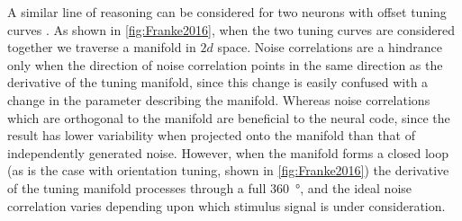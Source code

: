 A similar line of reasoning can be considered for two neurons with offset tuning curves \citet{Franke2016}.
As shown in \autoref{fig:Franke2016}, when the two tuning curves are considered together we traverse a manifold in $2d$ space.
Noise correlations are a hindrance only when the direction of noise correlation points in the same direction as the derivative of the tuning manifold, since this change is easily confused with a change in the parameter describing the manifold.
Whereas noise correlations which are orthogonal to the manifold are beneficial to the neural code, since the result has lower variability when projected onto the manifold than that of independently generated noise.
However, when the manifold forms a closed loop (as is the case with orientation tuning, shown in \autoref{fig:Franke2016}) the derivative of the tuning manifold processes through a full \SI{360}{\degree}, and the ideal noise correlation varies depending upon which stimulus signal is under consideration.

